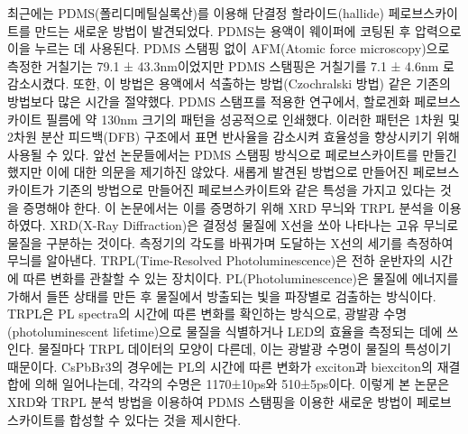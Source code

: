 최근에는 PDMS(폴리디메틸실록산)를 이용해 단결정 할라이드(hallide) 페로브스카이트를 만드는 새로운 방법이 발견되었다. PDMS는 용액이 웨이퍼에 코팅된 후 압력으로 이을 누르는 데 사용된다. PDMS 스탬핑 없이 AFM(Atomic force microscopy)으로 측정한 거칠기는 79.1 ± 43.3nm이었지만 PDMS 스탬핑은 거칠기를 7.1 ± 4.6nm 로 감소시켰다\cite{khoram2016growth}. 또한, 이 방법은 용액에서 석출하는 방법(Czochralski 방법) 같은 기존의 방법보다 많은 시간을 절약했다. PDMS 스탬프를 적용한 연구에서, 할로겐화 페로브스카이트 필름에 약 130nm 크기의 패턴을 성공적으로 인쇄했다\cite{brittman2017controlling}. 이러한 패턴은 1차원 및 2차원 분산 피드백(DFB) 구조에서 표면 반사율을 감소시켜 효율성을 향상시키기 위해 사용될 수 있다. 
앞선 논문들에서는 PDMS 스탬핑 방식으로 페로브스카이트를 만들긴 했지만 이에 대한 의문을 제기하진 않았다. 새롭게 발견된 방법으로 만들어진 페로브스카이트가 기존의 방법으로 만들어진 페로브스카이트와 같은 특성을 가지고 있다는 것을 증명해야 한다. 이 논문에서는 이를 증명하기 위해 XRD 무늬와 TRPL 분석을 이용하였다. 
XRD(X-Ray Diffraction)은 결정성 물질에 X선을 쏘아 나타나는 고유 무늬로 물질을 구분하는 것이다. 측정기의 각도를 바꿔가며 도달하는 X선의 세기를 측정하여 무늬를 알아낸다. 
TRPL(Time-Resolved Photoluminescence)은 전하 운반자의 시간에 따른 변화를 관찰할 수 있는 장치이다. PL(Photoluminescence)은 물질에 에너지를 가해서 들뜬 상태를 만든 후 물질에서 방출되는 빛을 파장별로 검출하는 방식이다. TRPL은 PL spectra의 시간에 따른 변화를 확인하는 방식으로, 광발광 수명(photoluminescent lifetime)으로 물질을 식별하거나 LED의 효율을 측정되는 데에 쓰인다. 물질마다 TRPL 데이터의 모양이 다른데, 이는 광발광 수명이 물질의 특성이기 때문이다. CsPbBr3의 경우에는 PL의 시간에 따른 변화가 exciton과 biexciton의 재결합에 의해 일어나는데, 각각의 수명은 1170±10ps와 510±5ps이다\cite{chen2018room}. 
이렇게 본 논문은 XRD와 TRPL 분석 방법을 이용하여 PDMS 스탬핑을 이용한 새로운 방법이 페로브스카이트를 합성할 수 있다는 것을 제시한다. 

